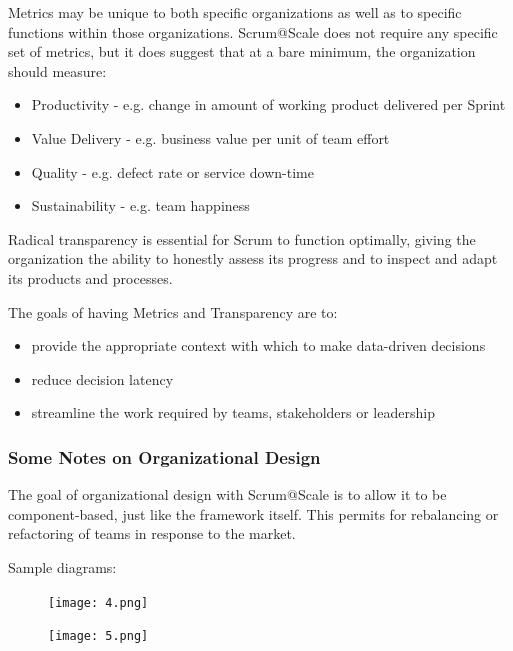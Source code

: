 \documentclass[12pt,a4paper,parskip=full]{scrartcl}
\begin{document}
Metrics may be unique to both specific organizations as well as to specific functions within those organizations. Scrum@Scale does not require any specific set of metrics, but it does suggest that at a bare minimum, the organization should measure:

\begin{itemize}
\itemsep1pt\parskip0pt
\item
  Productivity - e.g. change in amount of working product delivered per
  Sprint
\item
  Value Delivery - e.g. business value per unit of team effort
\item
  Quality - e.g. defect rate or service down-time
\item
  Sustainability - e.g. team happiness
\end{itemize}

Radical transparency is essential for Scrum to function optimally, giving the organization the ability to honestly assess its progress and to inspect and adapt its products and processes.

The goals of having Metrics and Transparency are to:

\begin{itemize}
\itemsep1pt\parskip0pt
\item
  provide the appropriate context with which to make data-driven
  decisions
\item
  reduce decision latency
\item
  streamline the work required by teams, stakeholders or leadership
\end{itemize}

\subsubsection{Some Notes on Organizational
Design}\label{some-notes-on-organizational-design}

The goal of organizational design with Scrum@Scale is to allow it to be component-based, just like the framework itself. This permits for rebalancing or refactoring of teams in response to the market.

Sample diagrams:
\begin{figure}[H]
    \centering
    \texttt{[image: 4.png]}
\end{figure}


\begin{figure}[H]
    \centering
    \texttt{[image: 5.png]}
\end{figure}
\end{document}

